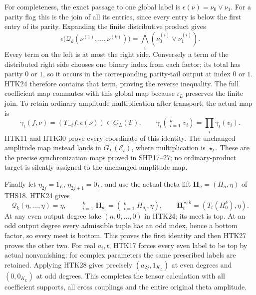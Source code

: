 For completeness, the exact passage to one global label is
$\epsilon(\nu)=\nu_0\vee\nu_1$.
For a parity flag this is the join of all its entries, since
every entry is below the first entry of its parity. Expanding
the finite distributive product gives
\begin{equation}\tag{HTK30}
 \epsilon\bigl(\mathscr Q_k(\nu^{(1)},\ldots,\nu^{(k)})\bigr)
                    =\bigwedge_i(\nu^{(i)}_0\vee\nu^{(i)}_1).
\end{equation}
Every term on the left is at most the right side.
Conversely a term of the distributed right side chooses
one binary index from each factor; its total has parity
$0$ or $1$, so it occurs in the corresponding parity-tail
output at index $0$ or $1$. HTK24 therefore contains that
term, proving the reverse inequality. The full coefficient
map commutes with this global map because $\iota_L$
preserves the finite join. To retain ordinary amplitude
multiplication after transport, the actual map is
\begin{equation}\tag{HTK31}
 \gamma_t(f,\nu)=(T_{-t}f,\epsilon(\nu))\in G_L(\mathcal E),
 \qquad
 \gamma_t\left(\mathop{\star_t}_{i=1}^k v_i\right)
                        =\prod_i\gamma_t(v_i).
\end{equation}
HTK11 and HTK30 prove every coordinate of this identity.
The unchanged amplitude map instead lands in
$G_L(\mathcal E_t)$, where multiplication is $\star_t$.
These are the precise synchronization maps proved in
SHP17--27; no ordinary-product target is silently assigned
to the unchanged amplitude map.

Finally let $\eta_{2j}=1_L$, $\eta_{2j+1}=0_L$, and use
the actual theta lift $\mathbf H_a=(H_a,\eta)$ of THS18.
HTK24 gives
\begin{equation}\tag{HTK32}
 \mathscr Q_k(\eta,\ldots,\eta)=\eta,\qquad
 \mathop{\star_t}_{i=1}^k\mathbf H_{a_i}
       =\left(\mathop{\star_t}_{i=1}^k H_{a_i},\eta\right),\qquad
 \mathbf H_t^{\star_t k}=(T_t(H_0^k),\eta).
\end{equation}
At any even output degree take $(n,0,\ldots,0)$ in HTK24;
its meet is top. At an odd output degree every admissible
tuple has an odd index, hence a bottom factor, so every
meet is bottom. This proves the first identity and then
HTK27 proves the other two. For real $a_i,t$, HTK17 forces
every even label to be top by actual nonvanishing; for
complex parameters the same prescribed labels are retained.
Applying HTK28 gives precisely $(a_{2j},1_{K_L})$ at even
degrees and $(0,0_{K_L})$ at odd degrees. This completes the
tensor calculation with all coefficient supports, all
cross couplings and the entire original theta amplitude.
